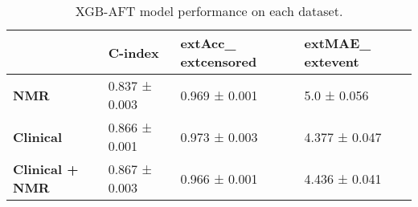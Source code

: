 \begin{table}
\caption{XGB-AFT model performance on each dataset.}
\label{tab:results_ex2}
\begin{tabular}{llll}
\toprule
 & C-index & 	ext{Acc}_{	ext{censored}} & 	ext{MAE}_{	ext{event}} \\
\midrule
\textbf{NMR} & 0.837 ± 0.003 & 0.969 ±                 0.001 & 5.0 ± 0.056 \\
\textbf{Clinical} & 0.866 ± 0.001 & 0.973 ±                 0.003 & 4.377 ± 0.047 \\
\textbf{Clinical + NMR} & 0.867 ± 0.003 & 0.966 ±                 0.001 & 4.436 ± 0.041 \\
\bottomrule
\end{tabular}
\end{table}
